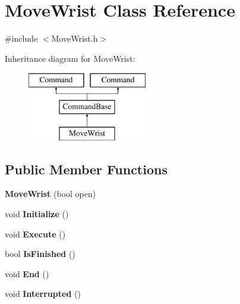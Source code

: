 \hypertarget{class_move_wrist}{}\section{Move\+Wrist Class Reference}
\label{class_move_wrist}


{\ttfamily \#include $<$Move\+Wrist.\+h$>$}

Inheritance diagram for Move\+Wrist\+:\begin{figure}[H]
\begin{center}
\leavevmode
\includegraphics[height=3.000000cm]{class_move_wrist}
\end{center}
\end{figure}
\subsection*{Public Member Functions}
\begin{DoxyCompactItemize}
\item 
\hypertarget{class_move_wrist_a6488180312f7a8eca76f9ead1342ef10}{}{\bfseries Move\+Wrist} (bool open)\label{class_move_wrist_a6488180312f7a8eca76f9ead1342ef10}

\item 
\hypertarget{class_move_wrist_a7b053ffafaef440ebec6b1719474353b}{}void {\bfseries Initialize} ()\label{class_move_wrist_a7b053ffafaef440ebec6b1719474353b}

\item 
\hypertarget{class_move_wrist_a1f38db78ec0dafaa9cfe83cdb5bc133e}{}void {\bfseries Execute} ()\label{class_move_wrist_a1f38db78ec0dafaa9cfe83cdb5bc133e}

\item 
\hypertarget{class_move_wrist_aea1c4b4c5984725cb4302a38850529e8}{}bool {\bfseries Is\+Finished} ()\label{class_move_wrist_aea1c4b4c5984725cb4302a38850529e8}

\item 
\hypertarget{class_move_wrist_a98b40a9310e27fbbead96c0208af0931}{}void {\bfseries End} ()\label{class_move_wrist_a98b40a9310e27fbbead96c0208af0931}

\item 
\hypertarget{class_move_wrist_ad44c5f341795ac74c24b4fc3fcf1db1c}{}void {\bfseries Interrupted} ()\label{class_move_wrist_ad44c5f341795ac74c24b4fc3fcf1db1c}

\end{DoxyCompactItemize}
